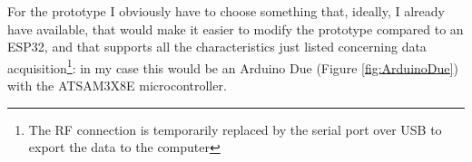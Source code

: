 \documentclass[a4paper, 10pt, final]{article} %
\begin{document}
        

    For the prototype I obviously have to choose something that, ideally, I already have available, that would make it easier to modify the prototype compared to an ESP32, and that supports all the characteristics just listed concerning data acquisition\footnote{The RF connection is temporarily replaced by the serial port over USB to export the data to the computer}: in my case this would be an Arduino Due (Figure \ref{fig:ArduinoDue}) with the ATSAM3X8E microcontroller.
\end{document}
